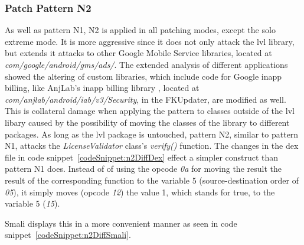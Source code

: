 \subsubsection{Patch Pattern N2}
As well as pattern N1, N2 is applied in all patching modes, except the solo extreme mode.
It is more aggressive since it does not only attack the \gls{lvl} library, but extends it attacks to other Google Mobile Service libraries, located at \textit{com/google/android/gms/ads/}.
The extended analysis of different applications showed the altering of custom libraries, which include code for Google inapp billing, like AnjLab's inapp billing library \cite{inappBilling}, located at \textit{com/anjlab/android/iab/v3/Security}, in the FKUpdater, are modified as well.
This is collateral damage when applying the pattern to classes outside of the \gls{lvl} libary caused by the possibility of moving the classes of the library to different packages.
As long as the \gls{lvl} package is untouched, pattern N2, similar to pattern N1, attacks the \textit{LicenseValidator} class's \textit{verify()} function.
\newline
The changes in the \gls{dex} file in code snippet~\ref{codeSnippet:n2DiffDex} effect a simpler construct than pattern N1 does.
Instead of of using the opcode \textit{0a} for moving the result the result of the corresponding function to the variable 5 (source-destination order of \textit{05}), it simply moves (opcode \textit{12}) the value 1, which stands for true, to the variable 5 (\textit{15}).
\newline


Smali displays this in a more convenient manner as seen in code snippet~\ref{codeSnippet:n2DiffSmali}.
\newline


